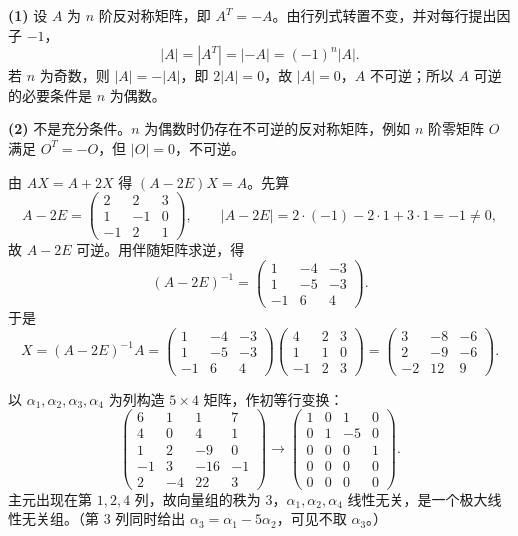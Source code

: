 \begin{solution}
\textbf{(1)} 设 $A$ 为 $n$ 阶反对称矩阵，即 $A^{T}=-A$。由行列式转置不变，并对每行提出因子 $-1$，
\[
|A|=|A^{T}|=|-A|=(-1)^{n}|A| .
\]
若 $n$ 为奇数，则 $|A|=-|A|$，即 $2|A|=0$，故 $|A|=0$，$A$ 不可逆；所以 $A$ 可逆的必要条件是 $n$ 为偶数。

\textbf{(2)} 不是充分条件。$n$ 为偶数时仍存在不可逆的反对称矩阵，例如 $n$ 阶零矩阵 $O$ 满足 $O^{T}=-O$，但 $|O|=0$，不可逆。
\end{solution}

\begin{solution}
由 $AX=A+2X$ 得 $(A-2E)X=A$。先算
\[
A-2E=\begin{pmatrix}2&2&3\\1&-1&0\\-1&2&1\end{pmatrix},
\qquad
|A-2E|=2\cdot(-1)-2\cdot1+3\cdot1=-1\ne0,
\]
故 $A-2E$ 可逆。用伴随矩阵求逆，得
\[
(A-2E)^{-1}=\begin{pmatrix}1&-4&-3\\1&-5&-3\\-1&6&4\end{pmatrix}.
\]
于是
\[
X=(A-2E)^{-1}A=\begin{pmatrix}1&-4&-3\\1&-5&-3\\-1&6&4\end{pmatrix}
\begin{pmatrix}4&2&3\\1&1&0\\-1&2&3\end{pmatrix}
=\begin{pmatrix}3&-8&-6\\2&-9&-6\\-2&12&9\end{pmatrix}.
\]
\end{solution}

\begin{solution}
以 $\alpha_1,\alpha_2,\alpha_3,\alpha_4$ 为列构造 $5\times4$ 矩阵，作初等行变换：
\[
\begin{pmatrix}6&1&1&7\\4&0&4&1\\1&2&-9&0\\-1&3&-16&-1\\2&-4&22&3\end{pmatrix}
\to\begin{pmatrix}1&0&1&0\\0&1&-5&0\\0&0&0&1\\0&0&0&0\\0&0&0&0\end{pmatrix}.
\]
主元出现在第 $1,2,4$ 列，故向量组的秩为 $3$，$\alpha_1,\alpha_2,\alpha_4$ 线性无关，是一个极大线性无关组。（第 $3$ 列同时给出 $\alpha_3=\alpha_1-5\alpha_2$，可见不取 $\alpha_3$。）
\end{solution}

